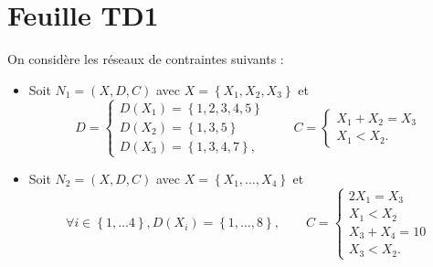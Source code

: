 \section{Feuille TD1}\label{sec:td1}

\begin{td-exo}
    On considère les réseaux de contraintes suivants :
    \begin{itemize}
        \item Soit \(N_1 = (X, D, C)\) avec \(X = \left\{X_1, X_2, X_3\right\}\) et 
        \begin{equation*}
            D = 
            \begin{cases}
                D(X_1) = \left\{1, 2, 3, 4, 5\right\} \\
                D(X_2) = \left\{1, 3, 5\right\} \\
                D(X_3) = \left\{1, 3, 4, 7\right\},
            \end{cases} \qquad
            C = 
            \begin{cases}
                X_1 + X_2  = X_3 \\
                X_1 < X_2.
            \end{cases}
        \end{equation*}

        \item Soit \(N_2 = (X, D, C)\) avec \(X = \left\{ X_1, \ldots, X_4\right\}\) et 
        \begin{equation*}
            \forall i \in \left\{1,\ldots 4\right\},
            D(X_i) = \left\{1,\ldots, 8\right\},
            \qquad
            C = 
            \begin{cases}
                2 X_1 = X_3 \\
                X_1 < X_2 \\
                X_3 + X_4 = 10 \\
                X_3 < X_2.
            \end{cases}
        \end{equation*}


\end{itemize}
\end{td-exo}

